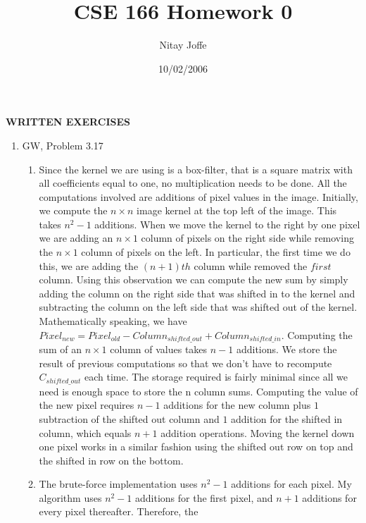 \documentclass[9pt]{article}
\title{CSE 166 Homework 0}
\author{Nitay Joffe}
\date{10/02/2006}
\begin{document}
  \maketitle
  \textbf{WRITTEN EXERCISES}
  \begin{enumerate}
    \item
      GW, Problem 3.17
      \begin{enumerate}
        \item
          Since the kernel we are using is a box-filter, that is a square
          matrix with all coefficients equal to one, no multiplication needs to
          be done. All the computations involved are additions of pixel values
          in the image.
          Initially, we compute the $ n \times n $ image kernel at the top
          left of the image. This takes $ n^{2} - 1 $ additions. When we move
          the kernel to the right by one pixel we are adding an $ n \times 1 $
          column of pixels on the right side while removing the $ n \times 1 $
          column of pixels on the left. In particular, the first time we do
          this, we are adding the $ (n+1)th $ column while removed the $ first
          $ column. Using this observation we can compute the new sum by simply
          adding the column on the right side that was shifted in to the kernel
          and subtracting the column on the left side that was shifted out of
          the kernel. Mathematically speaking, we have $ Pixel_{new} =
          Pixel_{old} - Column_{shifted\_out} + Column_{shifted\_in} $.
          Computing the sum of an $ n \times 1 $ column of values takes $ n-1 $
          additions.
          We store the result of previous computations so that we
          don't have to recompute $ C_{shifted\_out} $ each time. The storage
          required is fairly minimal since all we need is enough space to store
          the n column sums.
          Computing the value of the new pixel requires
          $ n - 1 $ additions for the new column plus $ 1 $ subtraction of the
          shifted out column and $ 1 $ addition for the shifted in column,
          which equals $ n + 1 $ addition operations.
          Moving the kernel down one pixel works in a similar
          fashion using the shifted out row on top and the shifted in row on
          the bottom. \\
        \item
          The brute-force implementation uses $ n^{2} - 1 $ additions for each
          pixel. My algorithm uses $ n^{2} - 1 $ additions for the first pixel,
          and $ n + 1 $ additions for every pixel thereafter. Therefore, the

\end{enumerate}
\end{enumerate}
\end{document}

